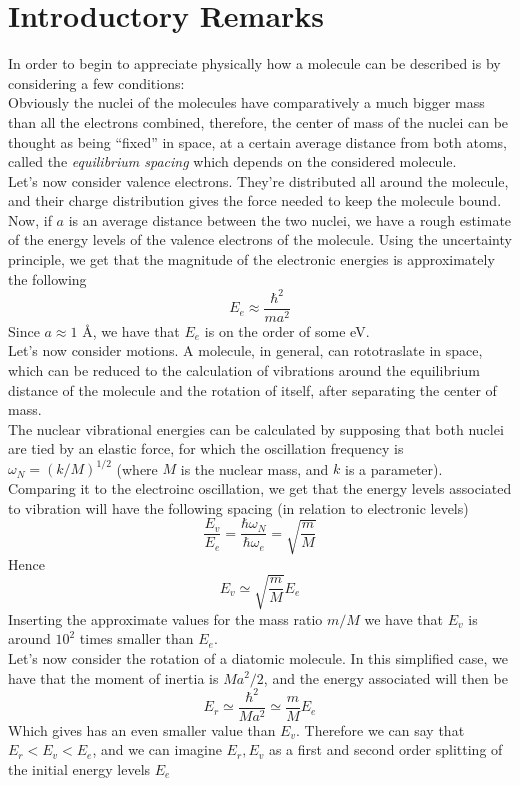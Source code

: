 \documentclass[../qm.tex]{subfiles}
\begin{document}
	\section{Introductory Remarks}
	In order to begin to appreciate physically how a molecule can be described is by considering a few conditions:\\
	Obviously the nuclei of the molecules have comparatively a much bigger mass than all the electrons combined, therefore, the center of mass of the nuclei can be thought as being ``fixed'' in space, at a certain average distance from both atoms, called the \textit{equilibrium spacing} which depends on the considered molecule.\\
	Let's now consider valence electrons. They're distributed all around the molecule, and their charge distribution gives the force needed to keep the molecule bound. Now, if $a$ is an average distance between the two nuclei, we have a rough estimate of the energy levels of the valence electrons of the molecule. Using the uncertainty principle, we get that the magnitude of the electronic energies is approximately the following
	\begin{equation*}
		E_e\approx\frac{\hbar^2}{ma^2}
	\end{equation*}
	Since $a\approx1$ \AA, we have that $E_e$ is on the order of some eV.\\
	Let's now consider motions. A molecule, in general, can rototraslate in space, which can be reduced to the calculation of vibrations around the equilibrium distance of the molecule and the rotation of itself, after separating the center of mass.\\
	The nuclear vibrational energies can be calculated by supposing that both nuclei are tied by an elastic force, for which the oscillation frequency is $\omega_N=(k/M)^{1/2}$ (where $M$ is the nuclear mass, and $k$ is a parameter). Comparing it to the electroinc oscillation, we get that the energy levels associated to vibration will have the following spacing (in relation to electronic levels)
	\begin{equation*}
		\frac{E_v}{E_e}=\frac{\hbar\omega_N}{\hbar\omega_e}=\sqrt{\frac{m}{M}}
	\end{equation*}
	Hence
	\begin{equation*}
		E_v\simeq\sqrt{\frac{m}{M}}E_e
	\end{equation*}
	Inserting the approximate values for the mass ratio $m/M$ we have that $E_v$ is around $10^{2}$ times smaller than $E_e$.\\
	Let's now consider the rotation of a diatomic molecule. In this simplified case, we have that the moment of inertia is $Ma^2/2$, and the energy associated will then be
	\begin{equation*}
		E_r\simeq\frac{\hbar^2}{Ma^2}\simeq\frac{m}{M}E_e
	\end{equation*}
	Which gives has an even smaller value than $E_v$. Therefore we can say that $E_r<E_v<E_e$, and we can imagine $E_r,E_v$ as a first and second order splitting of the initial energy levels $E_e$
\end{document}
